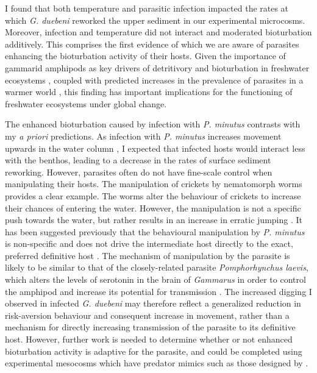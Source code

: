 I found that both temperature and parasitic infection impacted the rates at which \emph{G. duebeni} reworked the upper sediment in our experimental microcosms. Moreover, infection and temperature did not interact and moderated bioturbation additively. This comprises the first evidence of which we are aware of parasites enhancing the bioturbation activity of their hosts. Given the importance of gammarid amphipods as key drivers of detritivory and bioturbation in freshwater ecosystems \citep{hunting2012}, coupled with predicted increases in the prevalence of parasites in a warmer world \citep{galaktionov2017}, this finding has important implications for the functioning of freshwater ecosystems under global change.

The enhanced bioturbation caused by infection with \emph{P. minutus} contrasts with my \emph{a priori} predictions. As infection with \emph{P. minutus} increases movement upwards in the water column \citep{jacquin2014, perrot2016, bailly2017}, I expected that infected hosts would interact less with the benthos, leading to a decrease in the rates of surface sediment reworking. However, parasites often do not have fine-scale control when manipulating their hosts. The manipulation of crickets by nematomorph worms provides a clear example. The worms alter the behaviour of crickets to increase their chances of entering the water. However, the manipulation is not a specific push towards the water, but rather results in an increase in erratic jumping \citep{thomas2002}. It has been suggested previously that the behavioural manipulation by \emph{P. minutus} is non-specific and does not drive the intermediate host directly to the exact, preferred definitive host \citep{jacquin2014}. The mechanism of manipulation by the parasite is likely to be similar to that of the closely-related parasite \emph{Pomphorhynchus laevis}, which alters the levels of serotonin in the brain of \emph{Gammarus} in order to control the amphipod and increase its potential for transmission \citep{kaldonski2007, perrot2014}. The increased digging I observed in infected \emph{G. duebeni} may therefore reflect a generalized reduction in risk-aversion behaviour and consequent increase in movement, rather than a mechanism for directly increasing transmission of the parasite to its definitive host. However, further work is needed to determine whether or not enhanced bioturbation activity is adaptive for the parasite, and could be completed using experimental mesocosms which have predator mimics such as those designed by \citep{demandt2018}. 

